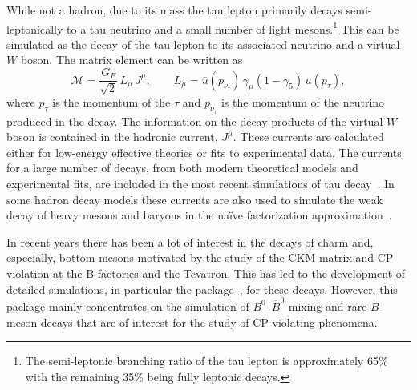   While not a hadron, due to its mass the tau lepton primarily decays
  semi-leptonically to a tau neutrino and a small number of light
  mesons.\footnote{The semi-leptonic branching ratio of the tau lepton
  is approximately 65\% with the remaining 35\% being fully leptonic decays.}
  This can be simulated as the decay of the tau lepton to its associated
  neutrino and a virtual $W$ boson. The matrix element can be written as
\begin{equation}
\mathcal{M} = \frac{G_F}{\sqrt{2}}\,L_\mu\,J^\mu,\qquad
L_\mu       = \bar{u}(p_{\nu_\tau})\,\gamma_\mu(1-\gamma_5)\,
        u(p_{\tau}),
\label{eqn:taudecay}
\end{equation}
  where $p_\tau$ is the momentum of the $\tau$ and $p_{\nu_\tau}$ is the momentum of the
  neutrino produced in the decay. The information on the decay products of the
  virtual $W$ boson is contained in the hadronic current, $J^\mu$.
  These currents are calculated either for low-energy effective theories or
  fits to experimental data. The currents for a large number of
  decays, from both modern theoretical models and experimental fits, are included
  in the most recent simulations of
  tau decay~\cite{Golonka:2003xt,Jadach:1993hs,Jadach:1990mz,Grellscheid:2007tt,Gleisberg:2008ta}.
  In some hadron decay models these currents are also used to simulate
  the weak decay of heavy mesons and baryons in the na\"ive factorization
  approximation~\cite{Wirbel:1985ji,Bauer:1986bm}.

  In recent years there has been a lot of interest in the decays of charm and, especially,
  bottom mesons motivated by the study of the CKM matrix and CP violation at the B-factories
  and the Tevatron. This has led to the development of detailed simulations, in particular the
  \evtgen package~\cite{Lange:2001uf}, for these decays. However, this 
  package mainly concentrates on the simulation of $B^0$--$\overline{B}^0$ mixing and rare
  $B$-meson decays that are of interest for the study of CP violating phenomena. 

